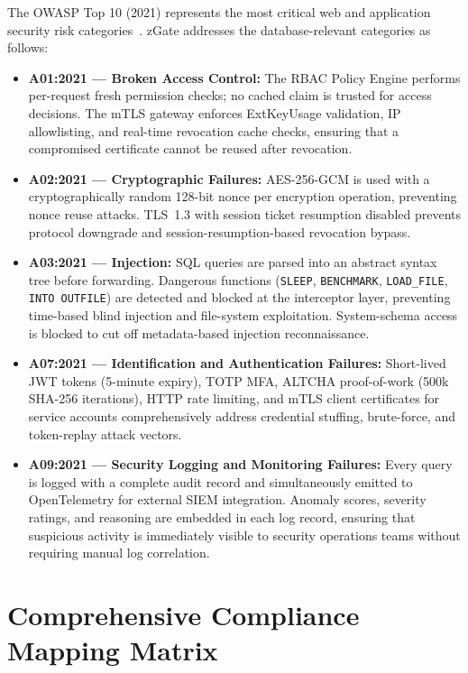 The OWASP Top 10 (2021) represents the most critical web and application security risk categories~\cite{owasp-top10}. zGate addresses the database-relevant categories as follows:

\begin{itemize}
    \item \textbf{A01:2021 --- Broken Access Control:} The RBAC Policy Engine performs per-request fresh permission checks; no cached claim is trusted for access decisions. The mTLS gateway enforces ExtKeyUsage validation, IP allowlisting, and real-time revocation cache checks, ensuring that a compromised certificate cannot be reused after revocation.
    \item \textbf{A02:2021 --- Cryptographic Failures:} AES-256-GCM is used with a cryptographically random 128-bit nonce per encryption operation, preventing nonce reuse attacks. TLS~1.3 with session ticket resumption disabled prevents protocol downgrade and session-resumption-based revocation bypass.
    \item \textbf{A03:2021 --- Injection:} SQL queries are parsed into an abstract syntax tree before forwarding. Dangerous functions (\texttt{SLEEP}, \texttt{BENCHMARK}, \texttt{LOAD\_FILE}, \texttt{INTO OUTFILE}) are detected and blocked at the interceptor layer, preventing time-based blind injection and file-system exploitation. System-schema access is blocked to cut off metadata-based injection reconnaissance.
    \item \textbf{A07:2021 --- Identification and Authentication Failures:} Short-lived JWT tokens (5-minute expiry), TOTP MFA, ALTCHA proof-of-work (500k SHA-256 iterations), HTTP rate limiting, and mTLS client certificates for service accounts comprehensively address credential stuffing, brute-force, and token-replay attack vectors.
    \item \textbf{A09:2021 --- Security Logging and Monitoring Failures:} Every query is logged with a complete audit record and simultaneously emitted to OpenTelemetry for external SIEM integration. Anomaly scores, severity ratings, and reasoning are embedded in each log record, ensuring that suspicious activity is immediately visible to security operations teams without requiring manual log correlation.
\end{itemize}

\section{Comprehensive Compliance Mapping Matrix}

